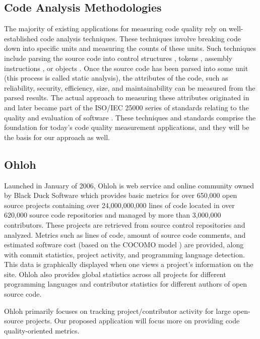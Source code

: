 \documentclass{sig-alternate}
\begin{document}
\subsection{Code Analysis Methodologies}
The majority of existing applications for measuring code quality rely on well-established code analysis techniques. These techniques involve breaking code down into specific units and measuring the counts of these units. Such techniques include parsing the source code into control structures \cite{mccabe1976complexity}, tokens \cite{halstead1977elements}, assembly instructions \cite{park1992software}, or objects \cite{chidamber1994metrics}. Once the source code has been parsed into some unit (this process is called static analysis), the attributes of the code, such as reliability, security, efficiency, size, and maintainability can be measured from the parsed results. The actual approach to measuring these attributes originated in \cite{boehm1976quantitative} and later became part of the ISO/IEC 25000 series of standards relating to the quality and evaluation of software \cite{iso2011iec}. These techniques and standards comprise the foundation for today's code quality measurement applications, and they will be the basis for our approach as well.

\subsection{Ohloh}
Launched in January of 2006, Ohloh \cite{allen2009ohloh} is web service and online community owned by Black Duck Software which provides basic metrics for over 650,000 open source projects containing over 24,000,000,000 lines of code located in over 620,000 source code repositories and managed by more than 3,000,000 contributors. These projects are retrieved from source control repositories and analyzed. Metrics such as lines of code, amount of source code comments, and estimated software cost (based on the COCOMO model \cite{boehm2000software}) are provided, along with commit statistics, project activity, and programming language detection. This data is graphically displayed when one views a project's information on the site. Ohloh also provides global statistics across all projects for different programming languages and contributor statistics for different authors of open source code. 

Ohloh primarily focuses on tracking project/contributor activity for large open-source projects. Our proposed application will focus more on providing code quality-oriented metrics.
\end{document}
